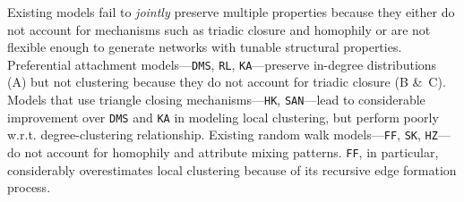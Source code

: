 

Existing models fail to \textit{jointly} preserve multiple properties
because they either do not account for mechanisms such as triadic closure and homophily
or are not flexible enough to generate networks with tunable structural properties.
Preferential attachment models---\texttt{DMS}, \texttt{RL}, \texttt{KA}---preserve in-degree
distributions (A) but not clustering because they do not account for triadic closure
(B \&~C).
Models that use triangle closing mechanisms---\texttt{HK}, \texttt{SAN}---lead to considerable improvement
over \texttt{DMS} and \texttt{KA} in modeling local clustering, but perform poorly w.r.t. degree-clustering
relationship.
Existing random walk models---\texttt{FF}, \texttt{SK}, \texttt{HZ}---
do not account for homophily and attribute mixing patterns.
\texttt{FF}, in particular, considerably overestimates local clustering because of its recursive edge
formation process.


